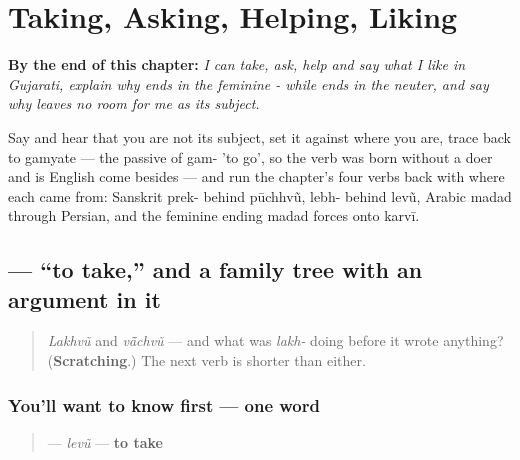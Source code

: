
\chapter{Taking, Asking, Helping, Liking}
\label{ch:gu-doing-verbs}

\begin{chapteropening}
\textbf{By the end of this chapter:} \emph{I can take, ask, help and say what I like in Gujarati, explain why   ends in the feminine - while   ends in the neuter, and say why     leaves no room for me as its subject.}

Say     and hear that you are not its subject, set it against     where you are, trace  back to gamyate — the passive of gam- 'to go', so the verb was born without a doer and is English come besides — and run the chapter's four verbs back with where each came from: Sanskrit prek- behind pūchhvũ, lebh- behind levũ, Arabic madad through Persian, and the feminine ending madad forces onto karvī.
\end{chapteropening}

\section[levũ]{ — \textquotedblleft{}to take,\textquotedblright{} and a family tree with an argument in it}

\label{lesson:GU-C09-levun}



\begin{quote}
\emph{Lakhvũ} and \emph{vā̃chvũ} — and what was \emph{lakh-} doing before it wrote anything? (\textbf{Scratching}.) The next verb is shorter than either.
\end{quote}

\subsection*{You'll want to know first — one word}
\begin{quote}
\textbf{} — \emph{levũ} — \textbf{to take}
\end{quote}

